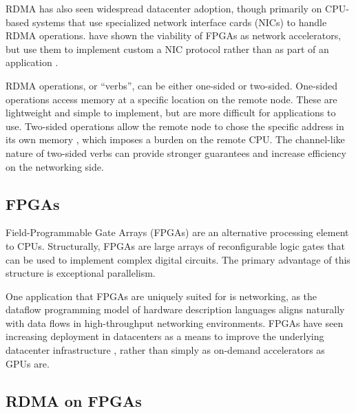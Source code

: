 RDMA has also seen widespread datacenter adoption, though primarily on CPU-based systems that use specialized network interface cards (NICs) to handle RDMA operations.
\citeauthor{star} have shown the viability of FPGAs as network accelerators, but use them to implement custom a NIC protocol rather than as part of an application \cite{star}.

RDMA operations, or ``verbs'', can be either one-sided or two-sided. One-sided operations access memory at a specific location on the remote node. These are lightweight and simple to implement, but are more difficult for applications to use. Two-sided operations allow the remote node to chose the specific address in its own memory \cite{base}, which imposes a burden on the remote CPU. The channel-like nature of two-sided verbs can provide stronger guarantees and increase efficiency on the networking side.


\subsection{FPGAs}

Field-Programmable Gate Arrays (FPGAs) are an alternative processing element to CPUs. Structurally, FPGAs are large arrays of reconfigurable logic gates that can be used to implement complex digital circuits. The primary advantage of this structure is exceptional parallelism.

One application that FPGAs are uniquely suited for is networking, as the dataflow programming model of hardware description languages aligns naturally with data flows in high-throughput networking environments.
FPGAs have seen increasing deployment in datacenters as a means to improve the underlying datacenter infrastructure \cite{bobda-trets-2022,fang-vldb-2020}, rather than simply as on-demand accelerators as GPUs are.


\subsection{RDMA on FPGAs}

